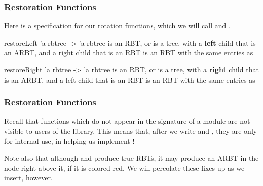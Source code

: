 \documentclass[aspectratio=169]{beamer}
\begin{document}
\begin{frame}
  \frametitle{Restoration Functions}

  Here is a specification for our rotation functions, which we will call
   and .

  \pause
  \spec
    {restoreLeft}
    {'a rbtree -> 'a rbtree}
    { is an RBT, or  is a  tree, with a \textbf{left}
    child that is an ARBT, and a right child that is an RBT}
    { is an RBT with the same entries as }

  \pause
  \spec
    {restoreRight}
    {'a rbtree -> 'a rbtree}
    { is an RBT, or  is a  tree, with a \textbf{right}
    child that is an ARBT, and a left child that is an RBT}
    { is an RBT with the same entries as }
\end{frame}

\begin{frame}
  \frametitle{Restoration Functions}

  Recall that functions which do not appear in the signature of a module
  are not visible to users of the library. This means that, after we
  write  and , they are only for
  internal use, in helping us implement !

  \pause
  \vspace{\fill}

  Note also that although  and  produce
  true RBTs, it may produce an ARBT in the node right above it, if it is
  colored red. We will percolate these fixes up as we insert, however.
\end{frame}
\end{document}
